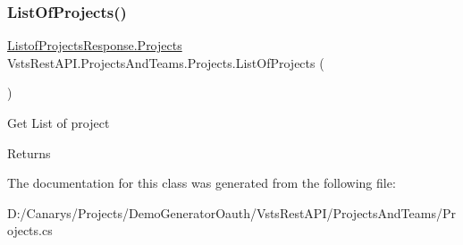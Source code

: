 \subsubsection{\texorpdfstring{List\+Of\+Projects()}{ListOfProjects()}}
{\footnotesize\ttfamily \mbox{\hyperlink{class_vsts_rest_a_p_i_1_1_viewmodel_1_1_project_and_teams_1_1_listof_projects_response_1_1_projects}{Listof\+Projects\+Response.\+Projects}} Vsts\+Rest\+A\+P\+I.\+Projects\+And\+Teams.\+Projects.\+List\+Of\+Projects (\begin{DoxyParamCaption}{ }\end{DoxyParamCaption})}



Get List of project 

\begin{DoxyReturn}{Returns}

\end{DoxyReturn}


The documentation for this class was generated from the following file\+:\begin{DoxyCompactItemize}
\item 
D\+:/\+Canarys/\+Projects/\+Demo\+Generator\+Oauth/\+Vsts\+Rest\+A\+P\+I/\+Projects\+And\+Teams/Projects.\+cs\end{DoxyCompactItemize}
